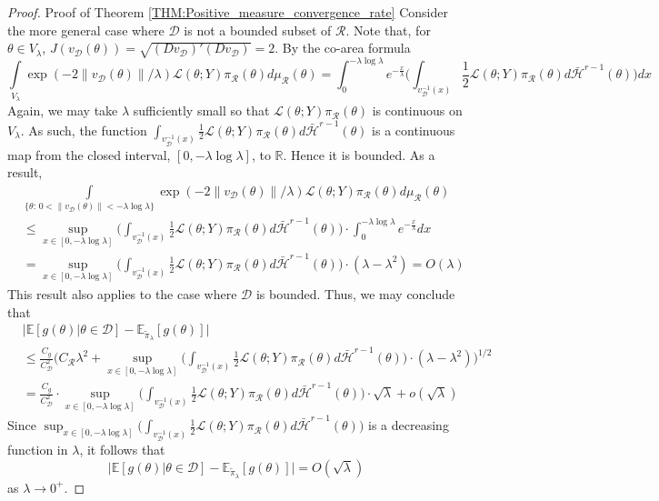 \documentclass[10pt,fleqn]{article} \pdfoutput=1
\newcommand{\bb}[1]{\mathbb{#1}} \newcommand{\mc}[1]{\mathcal{#1}}
\DeclareMathOperator{\1}{\mathbbm{1}} \DeclareMathOperator{\bigO}{\mc O}
\begin{document}
\begin{proof}{Proof of Theorem \ref{THM:Positive_measure_convergence_rate}}
Consider the more general case where $\mathcal{D}$ is not a bounded subset of $\mathcal{R}.$ Note that, for $\theta \in V_\lambda$, $J(v_{\mc D}(\theta))=\sqrt{(Dv_{\mc D})'(Dv_{\mc D})} = 2.$ By the co-area formula \cite{diaconis2013manifold,federer2014geometric}
$$\int\limits_{V_\lambda}\exp(-2\|v_{\mc D}(\theta)\|/\lambda )\mathcal{L}(\theta;Y)\pi_\mathcal{R}(\theta) d\mu_\mathcal{R}(\theta)  = \int_0^{-\lambda\log\lambda} e^{-\frac{x}{\lambda}}\bigg( \int_{v_{\mc D}^{-1}(x)} \frac{1}{2}\mathcal{L}(\theta;Y) \pi_\mathcal{R}(\theta) d\bar{\mathcal{H}}^{r-1}(\theta)\bigg) dx$$
Again, we may take $\lambda$ sufficiently small so that $\mathcal{L}(\theta;Y) \pi_\mathcal{R}(\theta) $ is continuous on $V_\lambda.$  As such, the function $ \int_{v_{\mc D}^{-1}(x)} \frac{1}{2}\mathcal{L}(\theta;Y) \pi_\mathcal{R}(\theta) d\bar{\mathcal{H}}^{r-1}(\theta)$ is a continuous map from the closed interval, $[0,-\lambda\log\lambda]$, to $\mathbb{R}.$ Hence it is bounded.  As a result, 
\begin{align*}
&\int\limits_{\{\theta: \, 0< \|v_{\mc D}(\theta)\|< -\lambda\log\lambda\}}\exp(-2\|v_{\mc D}(\theta)\|/\lambda )\mathcal{L}(\theta;Y)\pi_\mathcal{R}(\theta) d\mu_\mathcal{R}(\theta) \\
&\le \sup_{x \in [0,-\lambda\log\lambda]} \bigg( \int_{v_{\mc D}^{-1}(x)} \frac{1}{2}\mathcal{L}(\theta;Y) \pi_\mathcal{R}(\theta) d\bar{\mathcal{H}}^{r-1}(\theta)\bigg) \cdot \int_0^{-\lambda\log \lambda} e^{-\frac{x}{\lambda}}dx \\
& = \sup_{x \in [0,-\lambda\log\lambda]} \bigg( \int_{v_{\mc D}^{-1}(x)} \frac{1}{2}\mathcal{L}(\theta;Y) \pi_\mathcal{R}(\theta) d\bar{\mathcal{H}}^{r-1}(\theta)\bigg)  \cdot (\lambda - \lambda^2) = O(\lambda)
\end{align*}
This result also applies to the case where $\mathcal{D}$ is bounded.  Thus, we may conclude that
\begin{align*}
&\big| \bb E[g(\theta)|\theta\in\mathcal{D}]-\bb E_{\tilde{\pi}_\lambda}[g(\theta)]\big|\\
& \le  \frac{C_{g}}{C_\mathcal{D}^2}\bigg(C_\mathcal{R}\lambda^2 + \sup_{x \in [0,-\lambda\log\lambda]} \bigg( \int_{v_{\mc D}^{-1}(x)} \frac{1}{2}\mathcal{L}(\theta;Y) \pi_\mathcal{R}(\theta) d\bar{\mathcal{H}}^{r-1}(\theta)\bigg)  \cdot (\lambda - \lambda^2) \bigg)^{1/2} \\
&= \frac{C_{g}}{C_\mathcal{D}^2} \cdot \sup_{x \in [0,-\lambda\log\lambda]} \bigg( \int_{v_{\mc D}^{-1}(x)} \frac{1}{2}\mathcal{L}(\theta;Y) \pi_\mathcal{R}(\theta) d\bar{\mathcal{H}}^{r-1}(\theta)\bigg)  \cdot \sqrt{\lambda} + o(\sqrt{\lambda})
\end{align*}
Since $\sup_{x \in [0,-\lambda\log\lambda]} \bigg( \int_{v_{\mc D}^{-1}(x)} \frac{1}{2}\mathcal{L}(\theta;Y) \pi_\mathcal{R}(\theta) d\bar{\mathcal{H}}^{r-1}(\theta)\bigg)$ is a decreasing function in $\lambda$, it follows that $$\big| \bb E[g(\theta)|\theta\in\mathcal{D}]-\bb E_{\tilde{\pi}_\lambda}[g(\theta)]\big| = O(\sqrt{\lambda})$$
as $\lambda \to 0^+.$
\end{proof}
\end{document}
